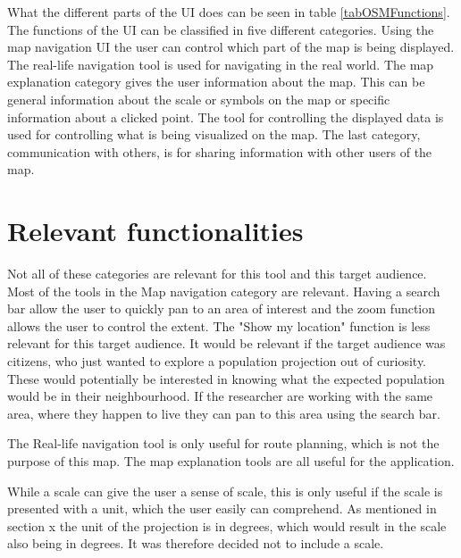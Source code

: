 What the different parts of the UI does can be seen in table \ref{tabOSMFunctions}. The functions of the UI can be classified in five different categories. Using the map navigation UI the user can control which part of the map is being displayed.
The real-life navigation tool is used for navigating in the real world. 
The map explanation category gives the user information about the map. This can be general information about the scale or symbols on the map or specific information about a clicked point. 
The tool for controlling the displayed data is used for controlling what is being visualized on the map.
The last category, communication with others, is for sharing information with other users of the map. 

\section{Relevant functionalities}\label{SortingFunctions}

Not all of these categories are relevant for this tool and this target audience. Most of the tools in the Map navigation category are relevant. Having a search bar allow the user to quickly pan to an area of interest and the zoom function allows the user to control the extent. The "Show my location" function is less relevant for this target audience. It would be relevant if the target audience was citizens, who just wanted to explore a population projection out of curiosity. These would potentially be interested in knowing what the expected population would be in their neighbourhood. If the researcher are working with the same area, where they happen to live they can pan to this area using the search bar. 

The Real-life navigation tool is only useful for route planning, which is not the purpose of this map. The map explanation tools are all useful for the application. 


While a scale can give the user a sense of scale, this is only useful if the scale is presented with a unit, which the user easily can comprehend. As mentioned in section x the unit of the projection is in degrees, which would result in the scale also being in degrees. It was therefore decided not to include a scale.

